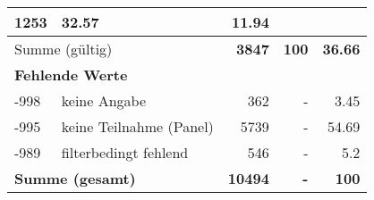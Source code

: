 \begin{longtable}{lXrrr}
       \num{1253} &
       \num[round-mode=places,round-precision=2]{32,57} &
         \num[round-mode=places,round-precision=2]{11,94} \\
     \midrule
     \multicolumn{2}{l}{Summe (gültig)} &
       \textbf{\num{3847}} &
     \textbf{100} &
       \textbf{\num[round-mode=places,round-precision=2]{36,66}} \\
     \multicolumn{5}{l}{\textbf{Fehlende Werte}}\\
       -998 &
       keine Angabe &
         \num{362} &
        - &
         \num[round-mode=places,round-precision=2]{3,45} \\
       -995 &
       keine Teilnahme (Panel) &
         \num{5739} &
        - &
         \num[round-mode=places,round-precision=2]{54,69} \\
       -989 &
       filterbedingt fehlend &
         \num{546} &
        - &
         \num[round-mode=places,round-precision=2]{5,2} \\
     \midrule
     \multicolumn{2}{l}{\textbf{Summe (gesamt)}} &
          \textbf{\num{10494}} &
        \textbf{-} &
        \textbf{100} \\
     \bottomrule
     \end{longtable}
     
